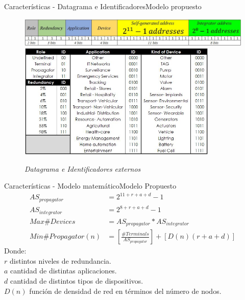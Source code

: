 \begin{frame}{Características - Datagrama e Identificadores}{Modelo propuesto}	
    \begin{figure}				
		\includegraphics[width=\textwidth,height=0.7\textheight,keepaspectratio]{Figures/Datagram2.JPG}
\\
		\includegraphics[width=0.85\textwidth,height=0.85\textheight,keepaspectratio]{Figures/IDs.JPG}
		\caption{\small \sl Datagrama e Identificadores externos}
		\label{figure:Identifiers}
    \end{figure}
\end{frame}
\begin{frame}{Características - Modelo matemático}{Modelo Propuesto}	
\begin{align}
AS_{propagator} &= 2^{11+r+a+d}-1  \label{eqn1}\\
AS_{integrator} &= 2^{8+r+a+d}-1  \label{eqn2}\\
Max \# Devices &= AS_{propagator}*AS_{integrator}  \label{eqn3}\\
Min \# Propagator(n) &= \left[ \frac{\# Terminals}{AS_{propagator}} \right ] + \left[D(n)(r+a+d) \right ] \label{eqn4}
\end{align}
Donde:\\
$r$ distintos niveles de redundancia.\\
$a$ cantidad de distintas aplicaciones.\\
$d$ cantidad de distintos tipos de dispositivos.\\
$D(n)$ función de densidad de red en términos del número de nodos.\\
\end{frame}
